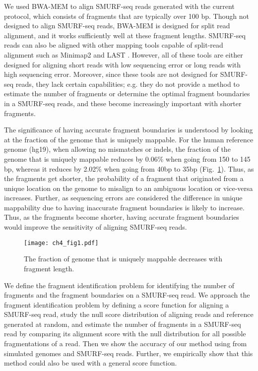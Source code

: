 We used BWA-MEM \citep{li2013aligning} to align SMURF-seq reads generated
with the current protocol, which consists of fragments that are
typically over 100 bp. Though not designed to align SMURF-seq reads,
BWA-MEM is designed for split read alignment, and it works sufficiently
well at these fragment lengths.  SMURF-seq reads can also be aligned
with other mapping tools capable of split-read alignment such as
Minimap2 \citep{li2018minimap2} and LAST \citep{kielbasa2011adaptive}.
However, all of these tools are either designed for aligning short reads
with low sequencing error or long reads with high sequencing error.
%
Moreover, since these tools are not designed for SMURF-seq reads, they
lack certain capabilities; e.g. they do not provide a method to estimate
the number of fragments or determine the optimal fragment boundaries in
a SMURF-seq reads, and these become increasingly important with shorter
fragments.

The significance of having accurate fragment boundaries is understood by
looking at the fraction of the genome that is uniquely mappable. For the
human reference genome (hg19), when allowing no mismatches or indels,
the fraction of the genome that is uniquely mappable reduces by 0.06\%
when going from 150 to 145 bp, whereas it reduces by 2.02\% when going
from 40bp to 35bp (Fig.~\ref{dzones}).
Thus, as the fragments get shorter, the probability of a fragment that
originated from a unique location on the genome to misalign to an
ambiguous location or vice-versa increases.
Further, as sequencing errors are considered the difference in unique
mappability due to having inaccurate fragment boundaries is likely to
increase.
%
Thus, as the fragments become shorter, having accurate fragment
boundaries would improve the sensitivity of aligning SMURF-seq reads.

\begin{figure}[t!]
\centering
\texttt{[image: ch4\_fig1.pdf]}
\caption{The fraction of genome that is uniquely mappable decreases with
          fragment length.}
\label{dzones}
\end{figure}


We define the fragment identification problem for identifying the
number of fragments and the fragment boundaries on a SMURF-seq read.
We approach the fragment identification problem by defining a score
function for aligning a SMURF-seq read, study the null score distribution of
aligning reads and reference generated at random, and estimate the
number of fragments in a SMURF-seq read by comparing its alignment score
with the null distribution for all possible fragmentations of a read.
Then we show the accuracy of our method using from simulated genomes and
SMURF-seq reads. Further, we empirically show that this method could
also be used with a general score function.

